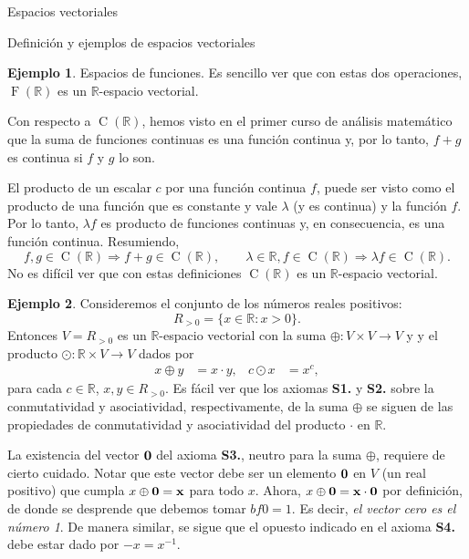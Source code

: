 \documentclass[a4paper,12pt,twoside,spanish,reqno]{amsbook}
\theoremstyle{definition}
\newtheorem{ejemplo}{Ejemplo}[section]
\theoremstyle{remark}
\newcommand{\R}{\mathbb R}
\begin{document}
\begin{chapter}{Espacios vectoriales}
\begin{section}{Definición y ejemplos de espacios vectoriales}
\begin{ejemplo}{\sc Espacios de funciones.}
                Es sencillo ver que con estas dos operaciones, $\operatorname{F}(\R)$ es un $\R$-espacio vectorial.
                
                Con respecto a $\operatorname{C}(\R)$, hemos visto en el primer curso de análisis matemático  que la suma de funciones continuas es una función continua y, por lo tanto, $f+g$ es continua si $f$ y $g$ lo son.  
                
                El producto de un escalar $c$ por una función continua $f$,  puede ser visto como el producto de una función que es constante y vale $\lambda $ (y es continua) y la función $f$. Por lo tanto, $\lambda f$ es producto de funciones continuas y, en consecuencia, es una función continua.  Resumiendo,
                \begin{equation*}
                f, g \in \operatorname{C}(\R) \Rightarrow f+g \in \operatorname{C}(\R), \qquad \lambda \in \R, f \in \operatorname{C}(\R) \Rightarrow \lambda f \in \operatorname{C}(\R).
                \end{equation*}
                No es difícil ver que con estas definiciones $\operatorname{C}(\R)$  es un $\R$-espacio vectorial.
            \end{ejemplo}
            
            
            
            \medspace
            
            \begin{ejemplo}
            Consideremos el conjunto de los números reales positivos:
            \[
            R_{>0}=\{x\in\R : x>0\}.
            \]
            Entonces $V=R_{>0}$ es un $\R$-espacio vectorial con la suma $\oplus:V\times V\to V$ y  y el producto $\odot:\R\times V\to V$ dados por
            \begin{align*}
            x\oplus y&=x\cdot y, & c\odot x&=x^c,
            \end{align*}
            para cada $c\in\R$, $x,y\in R_{>0}$.
Es fácil ver que los axiomas \textbf{S1.} y \textbf{S2.} sobre la conmutatividad y asociatividad, respectivamente, de la suma $\oplus$ se siguen de las propiedades de conmutatividad y asociatividad del producto $\cdot$ en $\R$.

La existencia del vector $\bf0$ del axioma \textbf{S3.}, neutro para la suma $\oplus$, requiere de cierto cuidado. Notar que este vector debe ser un elemento $\bf0$ en $V$ (un real positivo) que cumpla $x\oplus \bf 0=x$ para todo $x$. Ahora, $x\oplus \bf0=x\cdot \bf0$ por definición, de donde se desprende que debemos tomar $bf0=1$. Es decir, {\it el vector cero es el número 1}. De manera similar, se sigue que el opuesto indicado en el  axioma \textbf{S4.} debe estar dado por $-x=x^{-1}$.


\end{ejemplo}
\end{section}
\end{chapter}
\end{document}
